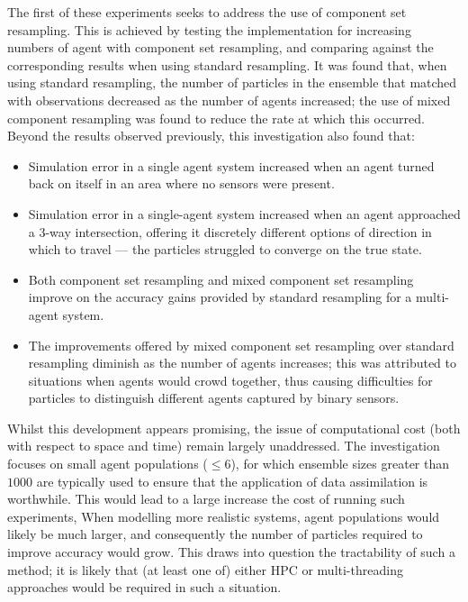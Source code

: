 The first of these experiments seeks to address the use of component set
resampling.
This is achieved by testing the implementation for increasing numbers of agent
with component set resampling, and comparing against the corresponding results
when using standard resampling.
It was found that, when using standard resampling, the number of particles in
the ensemble that matched with observations decreased as the number of agents
increased; the use of mixed component resampling was found to reduce the rate at
which this occurred.
Beyond the results observed previously, this investigation also found that:
\begin{itemize}
    \item Simulation error in a single agent system increased when an agent
        turned back on itself in an area where no sensors were present.
    \item Simulation error in a single-agent system increased when an agent
        approached a 3-way intersection, offering it discretely different
        options of direction in which to travel --- the particles struggled to
        converge on the true state.
    \item Both component set resampling and mixed component set resampling
        improve on the accuracy gains provided by standard resampling for a
        multi-agent system.
    \item The improvements offered by mixed component set resampling over
        standard resampling diminish as the number of agents increases; this was
        attributed to situations when agents would crowd together, thus causing
        difficulties for particles to distinguish different agents captured by
        binary sensors.
\end{itemize}
Whilst this development appears promising, the issue of computational cost (both
with respect to space and time) remain largely unaddressed.
The investigation focuses on small agent populations ($\leq 6$), for which
ensemble sizes greater than $1000$ are typically used to ensure that the
application of data assimilation is worthwhile.
This would lead to a large increase the cost of running such experiments, 
When modelling more realistic systems, agent populations would likely be much
larger, and consequently the number of particles required to improve accuracy
would grow.
This draws into question the tractability of such a method; it is likely that
(at least one of) either HPC or multi-threading approaches would be required in
such a situation.

